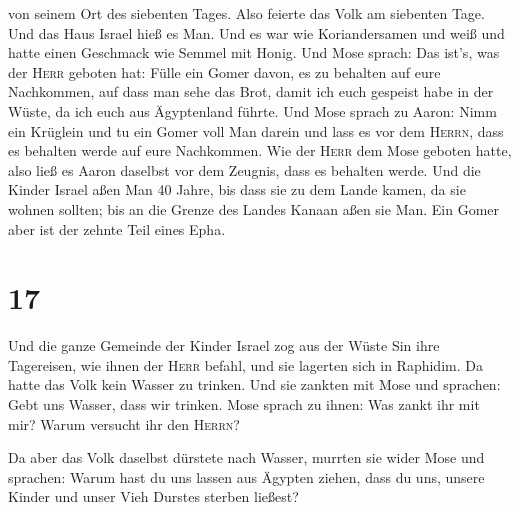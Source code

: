 von seinem Ort des siebenten Tages.  Also feierte das
Volk am siebenten Tage.  Und das Haus Israel hieß es Man.
Und es war wie Koriandersamen und weiß und hatte einen Geschmack wie
Semmel mit Honig.  Und Mose sprach: Das ist's, was der
\textsc{Herr} geboten hat: Fülle ein Gomer davon, es zu behalten auf
eure Nachkommen, auf dass man sehe das Brot, damit ich euch gespeist
habe in der Wüste, da ich euch aus Ägyptenland führte. 
Und Mose sprach zu Aaron: Nimm ein Krüglein und tu ein Gomer voll Man
darein und lass es vor dem \textsc{Herrn}, dass es behalten werde auf
eure Nachkommen.  Wie der \textsc{Herr} dem Mose geboten
hatte, also ließ es Aaron daselbst vor dem Zeugnis, dass es behalten
werde.  Und die Kinder Israel aßen Man 40 Jahre, bis dass
sie zu dem Lande kamen, da sie wohnen sollten; bis an die Grenze des
Landes Kanaan aßen sie Man.  Ein Gomer aber ist der
zehnte Teil eines Epha.

\hypertarget{section-16}{%
\section{17}\label{section-16}}

 Und die ganze Gemeinde der Kinder Israel zog aus der
Wüste Sin ihre Tagereisen, wie ihnen der \textsc{Herr} befahl, und sie
lagerten sich in Raphidim. Da hatte das Volk kein Wasser zu trinken.
 Und sie zankten mit Mose und sprachen: Gebt uns Wasser,
dass wir trinken. Mose sprach zu ihnen: Was zankt ihr mit mir? Warum
versucht ihr den \textsc{Herrn}?

 Da aber das Volk daselbst dürstete nach Wasser, murrten
sie wider Mose und sprachen: Warum hast du uns lassen aus Ägypten
ziehen, dass du uns, unsere Kinder und unser Vieh Durstes sterben
ließest?

